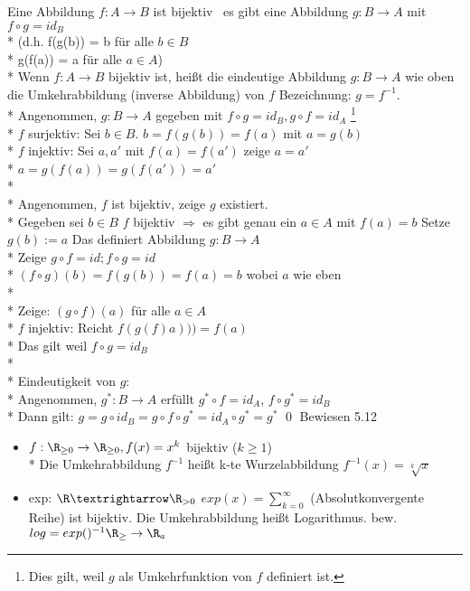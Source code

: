Eine Abbildung $f: A \to B$ ist bijektiv \equ \ es gibt eine Abbildung $g: B \to A$ mit $f \circ g = id_B$\\*
(d.h. f(g(b)) = b für alle $b \in B$\\*
      g(f(a)) = a für alle $a \in A$)\\*
%
Wenn $f:A→B$ bijektiv ist, heißt die eindeutige Abbildung $g:B→A$ wie oben die Umkehrabbildung (inverse Abbildung) von $f$
Bezeichnung: $g=f^{-1}$.\\*
%
\bew
Angenommen, $g: B \to A$ gegeben mit $f \circ g = id_B, g \circ f = id_A$ \footnote{Dies gilt, weil $g$ als Umkehrfunktion von $f$ definiert ist.}\\*
$f$ surjektiv: Sei $b \in B$. $b = f(g(b)) = f(a)$ mit $a = g(b)$ \ok\\*
$f$ injektiv: Sei $a, a'$ mit $f(a) = f(a')$ zeige $a = a'$ \\*
$a = g(f(a)) = g(f(a')) = a' $\ok \\* \\*
%
Angenommen, $f$ ist bijektiv, zeige $g$ existiert.\\*
Gegeben sei $b \in B$ $f$ bijektiv $\Rightarrow$ es gibt genau ein $a \in A $ mit $f(a) = b$ 
Setze $g(b):=a$ Das definiert Abbildung $g:B→A$\\*
Zeige $g \circ f=id; f \circ g = id$\\*
$(f\circ g)(b)=f(g(b))=f(a)=b$ wobei $a$ wie eben\\* \\*
%
Zeige: $(g \circ f) (a) $ für alle $a \in A$\\*
$f$ injektiv: Reicht $f(g(f)a))) = f(a)$\\*
Das gilt weil $f \circ g = id_B$ \ok \\* \\*
Eindeutigkeit von $g$:\\*
Angenommen, $g^* : B \to A$ erfüllt $g^* \circ f = id_A$,
$f \circ g^* = id_B$ \\*
%
Dann gilt: $g=g\circ id_B=g\circ f\circ g^*=id_A\circ g^* = g^*$ \qed
\bsp
Bewiesen 5.12
\begin{itemize}
\item{$f: \R_{\geq 0} \to \R_{\geq 0}, f(x) = x^k$ bijektiv ($k \geq 1$)\\*
Die Umkehrabbildung $f^{-1}$ heißt k-te Wurzelabbildung $f^{-1}(x) = \sqrt[k]{x}$ }
%
\item{exp: $\R→\R_{>0}$ $exp(x) = \sum_{k=0}^{\infty}$ (Absolutkonvergente Reihe) ist bijektiv. Die Umkehrabbildung heißt Logarithmus. bew.
$log = exp()^{-1} \R_{\geq } \to \R_a$ }
\end{itemize}

